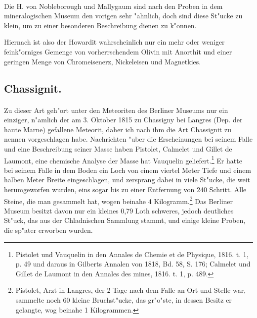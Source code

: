 \documentclass[a4paper, 11pt, oneside, german]{article}
\begin{document}
\paragraph{}
Die H. von Nobleborough und Mallygaum sind nach den Proben in dem mineralogischen Museum den vorigen sehr "ahnlich, doch sind diese St"ucke zu klein, um zu einer besonderen Beschreibung dienen zu k"onnen.

Hiernach ist also der Howardit wahrscheinlich nur ein mehr oder weniger feink"orniges Gemenge von vorherrschendem Olivin mit Anorthit und einer geringen Menge von Chromeisenerz, Nickeleisen und Magnetkies.
\subsection{Chassignit.}
\paragraph{}
Zu dieser Art geh"ort unter den Meteoriten des Berliner Museums nur ein einziger, n"amlich der am 3. Oktober 1815 zu Chassigny bei Langres (Dep. der haute Marne) gefallene Meteorit, daher ich nach ihm die Art Chassignit zu nennen vorgeschlagen habe. Nachrichten "uber die Erscheinungen bei seinem Falle und eine Beschreibung seiner Masse haben Pistolet, Calmelet und Gillet de Laumont, eine chemische Analyse der Masse hat Vauquelin geliefert.\footnote{Pistolet und Vauquelin in den Annales de Chemie et de Physique, 1816. t. 1, p. 49 und daraus in Gilberts Annalen von 1818, Bd. 58, S. 176; Calmelet und Gillet de Laumont in den Annales des mines, 1816. t. 1, p. 489.} Er hatte bei seinem Falle in dem Boden ein Loch von einem viertel Meter Tiefe und einem halben Meter Breite eingeschlagen, und zersprang dabei in viele St"ucke, die weit herumgeworfen wurden, eins sogar bis zu einer Entfernung von 240 Schritt. Alle Steine, die man gesammelt hat, wogen beinahe 4 Kilogramm.\footnote{Pistolet, Arzt in Langres, der 2 Tage nach dem Falle an Ort und Stelle war, sammelte noch 60 kleine Bruchst"ucke, das gr"o"ste, in dessen Besitz er gelangte, wog beinahe 1 Kilogrammen.} Das Berliner Museum besitzt davon nur ein kleines 0,79 Loth schweres, jedoch deutliches St"uck, das aus der Chladnischen Sammlung stammt, und einige kleine Proben, die sp"ater erworben wurden.
\end{document}

